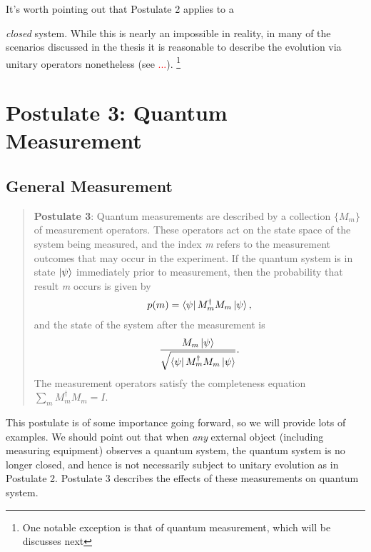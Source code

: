 It's worth pointing out that Postulate 2 applies to a {\emph{closed} system.  While this is nearly an impossible in reality, in many of the scenarios discussed in the thesis it is reasonable to describe the evolution via unitary operators nonetheless (see \textcolor{red}{...}).   \footnote{One notable exception is that of quantum measurement, which will be discusses next}

\section{Postulate 3: Quantum Measurement}
\subsection{General Measurement}


\begin{quote}
    \textbf{Postulate 3}: Quantum measurements are described by a collection $\{M_m\}$ of measurement operators. These operators act on the state space of the system being measured, and the index {\emph{m}} refers to the measurement outcomes that may occur in the experiment. If the quantum system is in state $\ket{\psi}$ immediately prior to measurement, then the probability that result {\emph{m}} occurs is given by 
    \begin{gather*}
        p(m)=\bra{\psi}M_m^\dagger M_m \ket{\psi},
    \end{gather*}
    and the state of the system after the measurement is
    \begin{gather*}
        \frac{M_m \ket{\psi}}{\sqrt{\bra{\psi}M_m^\dagger M_m \ket{\psi}}}.
    \end{gather*}
    The measurement operators satisfy the completeness equation $\sum_m M_m^\dagger M_m =I$.
\end{quote}


This postulate is of some importance going forward, so we will provide lots of examples.  We should point out that when {\emph{any}} external object (including measuring equipment) observes a quantum system, the quantum system is no longer closed, and hence is not necessarily subject to unitary evolution as in Postulate 2. Postulate 3 describes the effects of these measurements on quantum system. 

}
